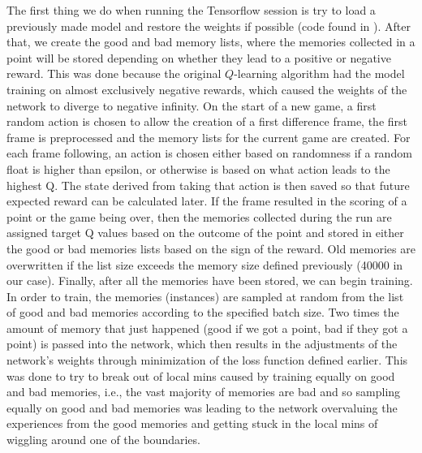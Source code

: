 \documentclass[12pt]{article}
\theoremstyle{plain}
\theoremstyle{definition}
\theoremstyle{remark}
\theoremstyle{plain}
\begin{document}
The first thing we do when running the Tensorflow session is try to load a previously made model and restore the weights if possible (code found in \cite{greydanus}).  After that, we create the good and bad memory lists, where the memories collected in a point will be stored depending on whether they lead to a positive or negative reward. This was done because the original $Q$-learning algorithm had the model training on almost exclusively negative rewards, which caused the weights of the network to diverge to negative infinity.  On the start of a new game, a first random action is chosen to allow the creation of a first difference frame, the first frame is preprocessed and the memory lists for the current game are created.  For each frame following, an action is chosen either based on randomness if a random float is higher than epsilon, or otherwise is based on what action leads to the highest Q.  The state derived from taking that action is then saved so that future expected reward can be calculated later.  If the frame resulted in the scoring of a point or the game being over, then the memories collected during the run are assigned target Q values based on the outcome of the point and stored in either the good or bad memories lists based on the sign of the reward.  Old memories are overwritten if the list size exceeds the memory size defined previously (40000 in our case).  Finally, after all the memories have been stored, we can begin training.  In order to train, the memories (instances) are sampled at random from the list of good and bad memories according to the specified batch size.  Two times the amount of memory that just happened (good if we got a point, bad if they got a point) is passed into the network, which then results in the adjustments of the network's weights through minimization of the loss function defined earlier. This was done to try to break out of local mins caused by training equally on good and bad memories, i.e., the vast majority of memories are bad and so sampling equally on good and bad memories was leading to the network overvaluing the experiences from the good memories and getting stuck in the local mins of wiggling around one of the boundaries.
\end{document}

